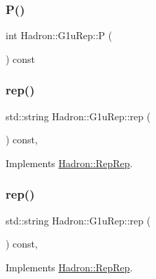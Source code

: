 \subsubsection{\texorpdfstring{P()}{P()}}
{\footnotesize\ttfamily int Hadron\+::\+G1u\+Rep\+::P (\begin{DoxyParamCaption}{ }\end{DoxyParamCaption}) const\hspace{0.3cm}{\ttfamily [inline]}}

\mbox{\label{structHadron_1_1G1uRep_a3c25822b246f892ed1eef8aeb4ae8252}} 
\subsubsection{\texorpdfstring{rep()}{rep()}\hspace{0.1cm}{\footnotesize\ttfamily [1/3]}}
{\footnotesize\ttfamily std\+::string Hadron\+::\+G1u\+Rep\+::rep (\begin{DoxyParamCaption}{ }\end{DoxyParamCaption}) const\hspace{0.3cm}{\ttfamily [inline]}, {\ttfamily [virtual]}}



Implements \mbox{\hyperlink{structHadron_1_1RepRep_ab3213025f6de249f7095892109575fde}{Hadron\+::\+Rep\+Rep}}.

\mbox{\label{structHadron_1_1G1uRep_a3c25822b246f892ed1eef8aeb4ae8252}} 
\subsubsection{\texorpdfstring{rep()}{rep()}\hspace{0.1cm}{\footnotesize\ttfamily [2/3]}}
{\footnotesize\ttfamily std\+::string Hadron\+::\+G1u\+Rep\+::rep (\begin{DoxyParamCaption}{ }\end{DoxyParamCaption}) const\hspace{0.3cm}{\ttfamily [inline]}, {\ttfamily [virtual]}}



Implements \mbox{\hyperlink{structHadron_1_1RepRep_ab3213025f6de249f7095892109575fde}{Hadron\+::\+Rep\+Rep}}.

